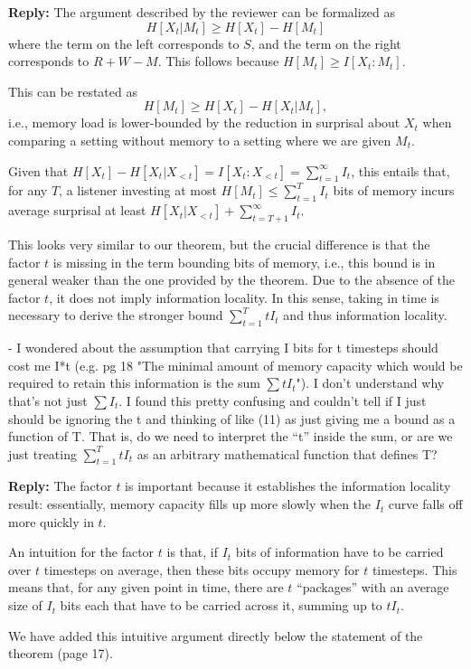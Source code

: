 \documentclass{article}[11pt,a4paper,oneside]
\newenvironment{reply}
  {\par\medskip
   \color{blue}%
   \begin{framed}
   \textbf{Reply: }\ignorespaces}
 {\end{framed}
  \medskip}
\begin{document}
\begin{reply}
The argument described by the reviewer can be formalized as
\begin{equation}
H[X_t|M_t] \geq H[X_t] - H[M_t]
\end{equation}
where the term on the left corresponds to $S$, and the term on the right corresponds to $R+W-M$.
This follows because $H[M_t] \ge I[X_t : M_t]$.

This can be restated as 
\begin{equation}
H[M_t] \geq H[X_t] - H[X_t|M_t],
\end{equation}
i.e., memory load is lower-bounded by the reduction in surprisal about $X_t$ when comparing a setting without memory to a setting where we are given $M_t$.

Given that $H[X_t] - H[X_t|X_{<t}] = I[X_t:X_{<t}] = \sum_{t=1}^\infty I_t$, this entails that, for any $T$, a listener investing at most $H[M_t] \leq \sum_{t=1}^T I_t$ bits of memory incurs average surprisal at least $H[X_t|X_{<t}] + \sum_{t=T+1}^\infty I_t$.

This looks very similar to our theorem, but the crucial difference is that the factor $t$ is missing in the term bounding bits of memory, i.e., this bound is in general weaker than the one provided by the theorem.
	Due to the absence of the factor $t$, it does not imply information locality.
In this sense, taking in time is necessary to derive the stronger bound $\sum_{t=1}^T t I_t$ and thus information locality.
\end{reply}

- I wondered about the assumption that carrying I bits for t timesteps should cost me I*t (e.g. pg 18 "The minimal amount of memory capacity which would be required to retain this information is the sum $\sum t I_t$"). I don't understand why that's not just $\sum I_t$. I found this pretty confusing and couldn't tell if I just should be ignoring the t and thinking of like (11) as just giving me a bound as a function of T. That is, do we need to interpret the ``t'' inside the sum, or are we just treating $\sum_{t=1}^T t I_t$ as an arbitrary mathematical function that defines T?

\begin{reply}
The factor $t$ is important because it establishes the information locality result: essentially, memory capacity fills up more slowly when the $I_t$ curve falls off more quickly in $t$.

An intuition for the factor $t$ is that, if $I_t$ bits of information have to be carried over $t$ timesteps on average, then these bits occupy memory for $t$ timesteps.
This means that, for any given point in time, there are $t$ ``packages'' with an average size of $I_t$ bits each that have to be carried across it, summing up to $t I_t$.

	We have added this intuitive argument directly below the statement of the theorem (page 17).
\end{reply}
\end{document}
